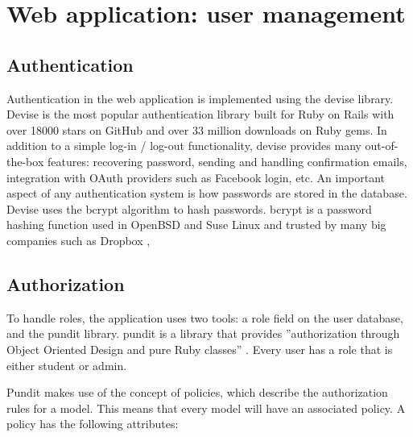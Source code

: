 \section{Web application: user management}
\subsection{Authentication}
Authentication in the web application is implemented using the devise library. Devise is the most popular authentication library built for Ruby on Rails with over 18000 stars on GitHub and over 33 million downloads on Ruby gems. In addition to a simple log-in / log-out functionality, devise provides many out-of-the-box features: recovering password, sending and handling confirmation emails, integration with OAuth providers such as Facebook login, etc. An important aspect of any authentication system is how passwords are stored in the database. Devise uses the bcrypt algorithm to hash passwords. bcrypt is a password hashing function \citep{wiki:bcrypt} used in OpenBSD and Suse Linux and trusted by many big companies such as Dropbox \citep{dropbox:authentication},

\subsection{Authorization}
To handle roles, the application uses two tools: a role field on the user database, and the pundit library. pundit is a library that provides ''authorization through Object Oriented Design and pure Ruby classes'' \citep{github:pundit}. Every user has a role that is either student or admin.

Pundit makes use of the concept of policies, which describe the authorization rules for a model. This means that every model will have an associated policy. A policy has the following attributes:

